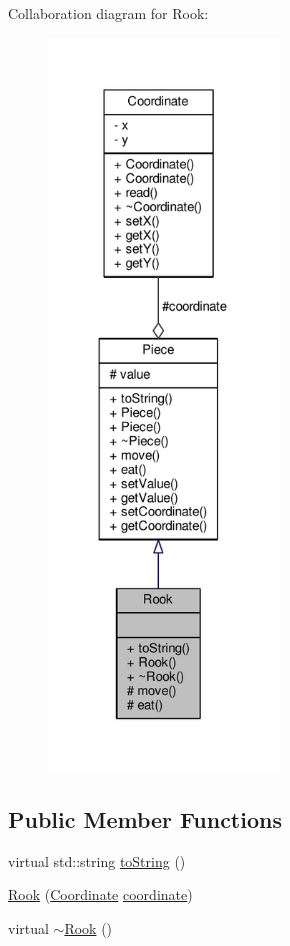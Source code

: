 Collaboration diagram for Rook\+:\nopagebreak
\begin{figure}[H]
\begin{center}
\leavevmode
\includegraphics[height=550pt]{class_rook__coll__graph}
\end{center}
\end{figure}
\subsection*{Public Member Functions}
\begin{DoxyCompactItemize}
\item 
virtual std\+::string \hyperlink{class_rook_a6b9d17ae219d74742a7deacf52aa4641}{to\+String} ()
\item 
\hyperlink{class_rook_afbcd69bc8c1a497b7656ddef8ec371f2}{Rook} (\hyperlink{class_coordinate}{Coordinate} \hyperlink{class_piece_a9e92373c8fffc1f5efb20d62204b70cf}{coordinate})
\item 
virtual \hyperlink{class_rook_a70d445b94848b22ded850b6f58bc2972}{$\sim$\+Rook} ()
\end{DoxyCompactItemize}
